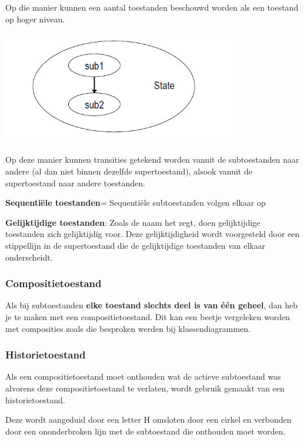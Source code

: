 Op die manier kunnen een aantal toestanden beschouwd worden als een toestand op hoger niveau.


\begin{center}
\includegraphics[width=4in]{img/substate}%
\end{center}

Op deze manier kunnen transities getekend worden vanuit de subtoestanden naar andere (al dan niet binnen dezelfde supertoestand), alsook vanuit de supertoestand naar andere toestanden.

\textbf{Sequentiële toestanden}= Sequentiële subtoestanden volgen elkaar op

\textbf{Gelijktijdige toestanden}: 
Zoals de naam het zegt, doen gelijktijdige toestanden zich gelijktijdig voor. Deze gelijktijdigheid wordt voorgesteld door een stippellijn in de supertoestand die de gelijktijdige toestanden van elkaar onderscheidt.

\subsubsection{Compositietoestand}

Als bij subtoestanden \textbf{elke toestand slechts deel is van één geheel}, dan heb je te maken met een compositietoestand. Dit kan een beetje vergeleken worden met composities zoals die besproken werden bij klassendiagrammen.

\subsubsection{Historietoestand}

Als een compositietoestand moet onthouden wat de actieve subtoestand was alvorens deze compositietoestand te verlaten, wordt gebruik gemaakt van een historietoestand.

Deze wordt aangeduid door een letter H omsloten door een cirkel en verbonden door een ononderbroken lijn met de subtoestand die onthouden moet worden.

